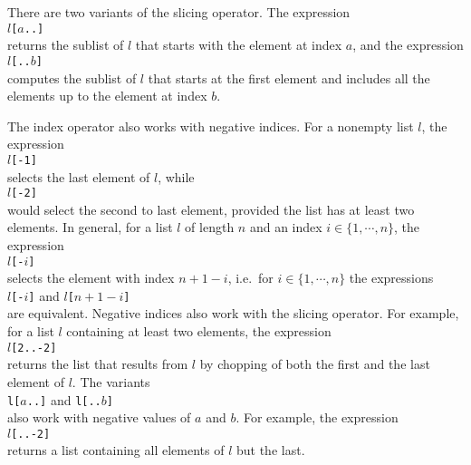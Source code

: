 There are two variants of the slicing operator.   The expression
\\[0.2cm]
\hspace*{1.3cm}
\texttt{$l$[$a$..]}
\\[0.2cm]
returns the sublist of $l$ that starts with the element at index $a$, and the expression
\\[0.2cm]
\hspace*{1.3cm}
\texttt{$l$[..$b$]}
\\[0.2cm]
computes the sublist of $l$ that starts at the first element and includes all the elements up to the
element at index $b$.

The index operator also works with negative indices.  For a nonempty list $l$, the expression
\\[0.2cm]
\hspace*{1.3cm}
\texttt{$l$[-1]}
\\[0.2cm]
selects the last element of $l$, while
\\[0.2cm]
\hspace*{1.3cm}
\texttt{$l$[-2]}
\\[0.2cm]
would select the second to last element, provided the list has at least two elements.  In general, for a list $l$ of length $n$ and an index 
$i\in \{1,\cdots,n\}$, the expression
\\[0.2cm]
\hspace*{1.3cm}
\texttt{$l$[-$i$]}
\\[0.2cm]
selects the element with index $n + 1 - i$, i.e.~for $i \in \{1,\cdots,n\}$ the expressions
\\[0.2cm]
\hspace*{1.3cm}
\texttt{$l$[-$i$]} \quad and \quad \texttt{$l$[$n+1-i$]}
\\[0.2cm]
are equivalent.  Negative indices also work with the slicing operator.  For example, for a list $l$
containing at least two elements, the expression
\\[0.2cm]
\hspace*{1.3cm}
\texttt{$l$[2..-2]}
\\[0.2cm]
returns the list that results from $l$ by chopping of both the first and the last element of $l$.
The variants
\\[0.2cm]
\hspace*{1.3cm}
\texttt{l[$a$..]} \quad and \quad \texttt{l[..$b$]}
\\[0.2cm]
also work with negative values of $a$ and $b$.  For example, the expression
\\[0.2cm]
\hspace*{1.3cm}
\texttt{$l$[..-2]}
\\[0.2cm]
returns a list containing all elements of $l$ but the last.

